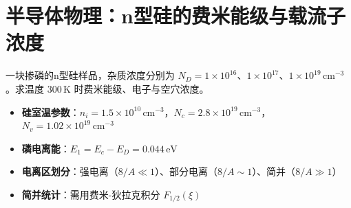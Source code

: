 \section{半导体物理：n型硅的费米能级与载流子浓度}
\label{sec:n-si-fermi-level}

\begin{modelbox}[题目：不同掺杂浓度n型硅的统计性质]
一块掺磷的n型硅样品，杂质浓度分别为 $N_D=1\times10^{16}$、$1\times10^{17}$、$1\times10^{19}\,\text{cm}^{-3}$。求温度 $300\,\text{K}$ 时费米能级、电子与空穴浓度。
\end{modelbox}

\begin{tipbox}[考点快速分析]
\begin{itemize}
    \item \textbf{硅室温参数}：$n_i=1.5\times10^{10}\,\text{cm}^{-3}$，$N_c=2.8\times10^{19}\,\text{cm}^{-3}$，$N_v=1.02\times10^{19}\,\text{cm}^{-3}$
    \item \textbf{磷电离能}：$E_1=E_c-E_D=0.044\,\text{eV}$
    \item \textbf{电离区划分}：强电离（$8/A\ll1$）、部分电离（$8/A\sim1$）、简并（$8/A\gg1$）
    \item \textbf{简并统计}：需用费米-狄拉克积分 $F_{1/2}(\xi)$
\end{itemize}
\end{tipbox}

